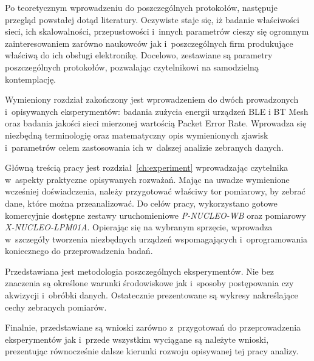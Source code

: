 Po teoretycznym wprowadzeniu do poszczególnych protokołów, następuje przegląd powstałej dotąd
literatury. Oczywiste staje się, iż badanie właściwości sieci, ich skalowalności, przepustowości
i~innych parametrów cieszy się ogromnym zainteresowaniem zarówno naukowców jak i~poszczególnych
firm produkujące właściwą do ich obsługi elektronikę. Docelowo, zestawiane są parametry poszczególnych
protokołów, pozwalając czytelnikowi na samodzielną kontemplację.

Wymieniony rozdział zakończony jest wprowadzeniem do dwóch prowadzonych i~opisywanych eksperymentów:
badania zużycia energii urządzeń BLE i BT Mesh oraz badania jakości sieci mierzonej wartością
Packet Error Rate. Wprowadza się niezbędną terminologię oraz matematyczny opis wymienionych zjawisk
i~parametrów celem zastosowania ich w~dalszej analizie zebranych danych.

Główną treścią pracy jest rozdział~\ref{ch:experiment} wprowadzając czytelnika w~aspekty praktyczne opisywanych
rozważań. Mając na uwadze wymienione wcześniej doświadczenia, należy przygotować właściwy tor
pomiarowy, by zebrać dane, które można przeanalizować. Do celów pracy, wykorzystano
gotowe komercyjnie dostępne zestawy uruchomieniowe \textit{P-NUCLEO-WB} oraz pomiarowy
\textit{X-NUCLEO-LPM01A}. Opierając się na wybranym sprzęcie, wprowadza w~szczegóły
tworzenia niezbędnych urządzeń wspomagających i~oprogramowania koniecznego
do przeprowadzenia badań.

Przedstawiana jest metodologia poszczególnych eksperymentów. Nie bez znaczenia są określone
warunki środowiskowe jak i~sposoby postępowania czy akwizycji i~obróbki danych. Ostatecznie
prezentowane są wykresy nakreślające cechy zebranych pomiarów.

Finalnie, przedstawiane są wnioski zarówno z~przygotowań do przeprowadzenia eksperymentów
jak i~przede wszystkim wyciągane są należyte wnioski, prezentując równocześnie 
dalsze kierunki rozwoju opisywanej tej pracy analizy.

